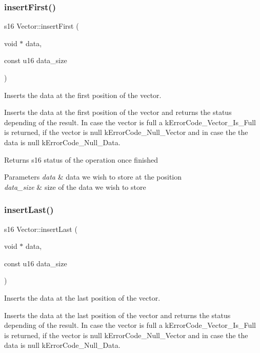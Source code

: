 \subsubsection{\texorpdfstring{insert\+First()}{insertFirst()}}
{\footnotesize\ttfamily s16 Vector\+::insert\+First (\begin{DoxyParamCaption}\item[{void $\ast$}]{data,  }\item[{const u16}]{data\+\_\+size }\end{DoxyParamCaption})}



Inserts the data at the first position of the vector. 

Inserts the data at the first position of the vector and returns the status depending of the result. In case the vector is full a k\+Error\+Code\+\_\+\+Vector\+\_\+\+Is\+\_\+\+Full is returned, if the vector is null k\+Error\+Code\+\_\+\+Null\+\_\+\+Vector and in case the the data is null k\+Error\+Code\+\_\+\+Null\+\_\+\+Data.

\begin{DoxyReturn}{Returns}
s16 status of the operation once finished 
\end{DoxyReturn}

\begin{DoxyParams}{Parameters}
{\em data} & data we wish to store at the position \\
\hline
{\em data\+\_\+size} & size of the data we wish to store \\
\hline
\end{DoxyParams}
\mbox{\label{class_vector_a4e762aa3819ce9c217d38095f6fb3a0b}} 
\subsubsection{\texorpdfstring{insert\+Last()}{insertLast()}}
{\footnotesize\ttfamily s16 Vector\+::insert\+Last (\begin{DoxyParamCaption}\item[{void $\ast$}]{data,  }\item[{const u16}]{data\+\_\+size }\end{DoxyParamCaption})}



Inserts the data at the last position of the vector. 

Inserts the data at the last position of the vector and returns the status depending of the result. In case the vector is full a k\+Error\+Code\+\_\+\+Vector\+\_\+\+Is\+\_\+\+Full is returned, if the vector is null k\+Error\+Code\+\_\+\+Null\+\_\+\+Vector and in case the the data is null k\+Error\+Code\+\_\+\+Null\+\_\+\+Data.

